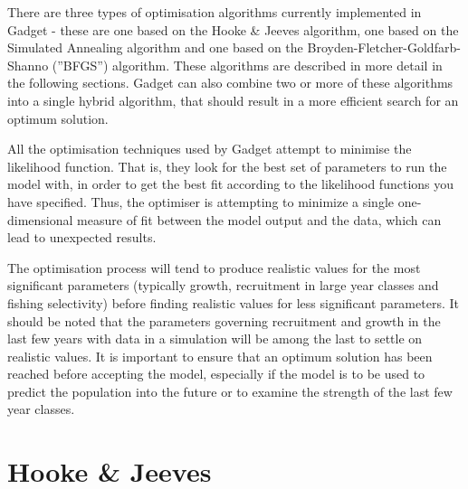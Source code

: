 \documentclass[10pt,twoside]{book}
\begin{document}
There are three types of optimisation algorithms currently implemented in Gadget - these are one based on the Hooke \& Jeeves algorithm, one based on the Simulated Annealing algorithm and one based on the Broyden-Fletcher-Goldfarb-Shanno (''BFGS'') algorithm.  These algorithms are described in more detail in the following sections.  Gadget can also combine two or more of these algorithms into a single hybrid algorithm, that should result in a more efficient search for an optimum solution.

\bigskip
All the optimisation techniques used by Gadget attempt to minimise the likelihood function. That is, they look for the best set of parameters to run the model with, in order to get the best fit according to the likelihood functions you have specified.  Thus, the optimiser is attempting to minimize a single one-dimensional measure of fit between the model output and the data, which can lead to unexpected results.

\bigskip
The optimisation process will tend to produce realistic values for the most significant parameters (typically growth, recruitment in large year classes and fishing selectivity) before finding realistic values for less significant parameters.  It should be noted that the parameters governing recruitment and growth in the last few years with data in a simulation will be among the last to settle on realistic values.  It is important to ensure that an optimum solution has been reached before accepting the model, especially if the model is to be used to predict the population into the future or to examine the strength of the last few year classes.

\section{Hooke \& Jeeves}\label{sec:hooke}
\end{document}

